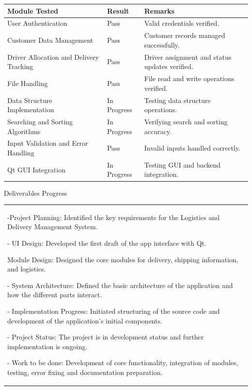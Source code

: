 \documentclass[12pt,a4paper]{article}
\newcommand{\sectiontitle}[1]{%
    {\color{GEUBlue}
    \fontsize{18}{22}\selectfont #1}
}
\newcommand{\instruction}[1]{%
    {\color{InstructionGrey}
    \fontsize{10.5}{13}\selectfont #1}
}
\newcommand{\answerbox}[2]{%
    \begin{tabularx}{\textwidth}{
        |>{\raggedright\arraybackslash}X|}
        \hline
        \parbox[t][#1][t]{\dimexpr\linewidth-12pt\relax}{
            \vspace{5pt}
            \fontsize{11}{13}\selectfont #2
        }\\
        \hline
    \end{tabularx}
}
\begin{document}
\begin{tabularx}{\textwidth}{
|>{\raggedright\arraybackslash}p{}
|>{\raggedright\arraybackslash}p{}
|>{\raggedright\arraybackslash}X|
}
\hline

\textbf{Module Tested} &
\textbf{Result} &
\textbf{Remarks}
\\
\hline

User Authentication &
Pass &
Valid credentials verified.
\\
\hline

Customer Data Management &
Pass &
Customer records managed successfully.
\\
\hline

Driver Allocation and Delivery Tracking &
Pass &
Driver assignment and status updates verified.
\\
\hline

File Handling &
Pass &
File read and write operations verified.
\\
\hline

Data Structure Implementation &
In Progress &
Testing data structure operations.
\\
\hline

Searching and Sorting Algorithms &
In Progress &
Verifying search and sorting accuracy.
\\
\hline

Input Validation and Error Handling &
Pass &
Invalid inputs handled correctly.
\\
\hline

Qt GUI Integration &
In Progress &
Testing GUI and backend integration.
\\
\hline

\end{tabularx}

\vspace{0.65cm}
\newpage
\sectiontitle{Deliverables Progress }

\vspace{0.05cm}

\instruction{

}

\vspace{0.25cm}

\answerbox{5.20cm}{-Project Planning: Identified the key requirements for the Logistics and Delivery Management System.

- UI Design: Developed the first draft of the app interface with Qt.

Module Design: Designed the core modules for delivery, shipping information, and logistics.

- System Architecture: Defined the basic architecture of the application and how the different parts interact.

- Implementation Progress: Initiated structuring of the source code and development of the application’s initial components.

- Project Status: The project is in development status and further implementation is ongoing.

- Work to be done: Development of core functionality, integration of modules, testing, error fixing and documentation preparation.}
\end{document}

